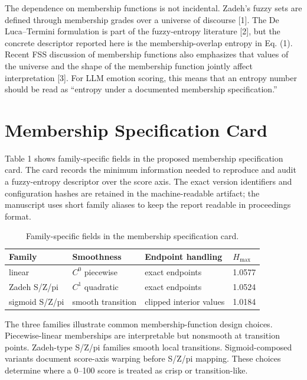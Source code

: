 \documentclass[a4paper,10pt,twocolumn]{myjarticle2}
\begin{document}
The dependence on membership functions is not incidental. Zadeh's fuzzy sets
are defined through membership grades over a universe of discourse [1]. The
De Luca--Termini formulation is part of the fuzzy-entropy literature [2], but
the concrete descriptor reported here is the membership-overlap entropy in
Eq. (1). Recent FSS discussion of membership functions also emphasizes that
values of the universe and the shape of the membership function jointly affect
interpretation [3]. For LLM emotion scoring, this means that an entropy number
should be read as ``entropy under a documented membership specification.''

\section{Membership Specification Card}

Table 1 shows family-specific fields in the proposed membership specification
card. The card records the minimum information needed to reproduce and audit a
fuzzy-entropy descriptor over the score axis. The exact version identifiers and
configuration hashes are retained in the machine-readable artifact; the
manuscript uses short family aliases to keep the report readable in proceedings
format.

\begin{table}
\centering
\caption{Family-specific fields in the membership specification card.}
\label{tab:membership-card}
\footnotesize
\setlength{\tabcolsep}{2pt}
\begin{tabular}{|p{18mm}|p{16mm}|p{20mm}|p{10mm}|}
\hline
Family & Smoothness & Endpoint handling & $H_{\max}$ \\
\hline
linear & $C^0$ piecewise & exact endpoints & 1.0577 \\
\hline
Zadeh S/Z/pi & $C^1$ quadratic & exact endpoints & 1.0524 \\
\hline
sigmoid S/Z/pi & smooth transition & clipped interior values & 1.0184 \\
\hline
\end{tabular}
\end{table}

The three families illustrate common membership-function design choices.
Piecewise-linear memberships are interpretable but nonsmooth at transition
points. Zadeh-type S/Z/pi families smooth local transitions. Sigmoid-composed
variants document score-axis warping before S/Z/pi mapping. These choices
determine where a 0--100 score is treated as crisp or transition-like.
\end{document}

